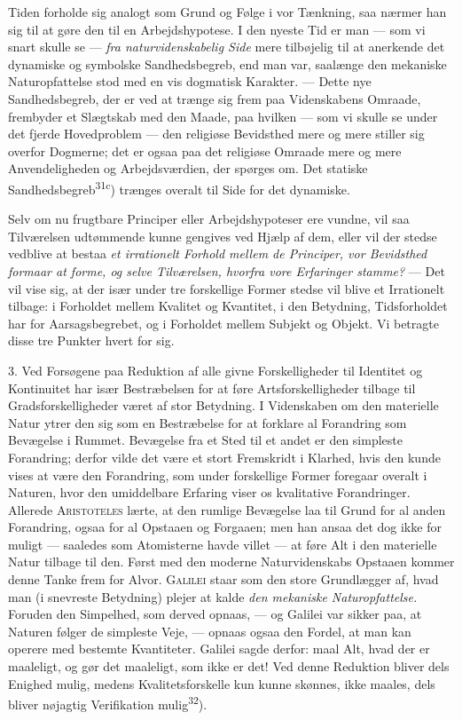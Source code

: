 \documentclass[12pt,a4paper,openany]{book}
\newcommand{\opage}[1]{\marginnote{\footnotesize\textit{[#1]}}}
\begin{document}
Tiden forholde sig analogt som Grund og Følge i vor Tænkning, saa nærmer han
sig til at gøre den til en Arbejdshypotese. I den nyeste Tid er man --- som vi
snart skulle se --- \textit{fra naturvidenskabelig Side} mere tilbøjelig til at
anerkende det dynamiske og symbolske Sandhedsbegreb, end man var, saalænge den
mekaniske Naturopfattelse stod med en vis dogmatisk Karakter. --- Dette nye
Sandhedsbegreb, der er ved at trænge sig frem paa Videnskabens Omraade,
frembyder et Slægtskab med den Maade, paa hvilken --- som vi skulle se under
det fjerde Hovedproblem --- den religiøse Bevidsthed mere og mere stiller sig
overfor Dogmerne; det er ogsaa paa det religiøse Omraade mere og mere
Anvendeligheden og Arbejdsværdien, der spørges om. Det statiske
Sandhedsbegreb\textsuperscript{31c}) trænges overalt til Side for det dynamiske.

Selv om nu frugtbare Principer eller Arbejdshypoteser ere vundne, vil saa
Tilværelsen udtømmende kunne gengives ved Hjælp af dem, eller vil der stedse
vedblive at bestaa \textit{et irrationelt Forhold mellem de Principer, vor
Bevidsthed formaar at forme, og selve Tilværelsen, hvorfra vore Erfaringer
stamme?} --- Det vil vise sig, at der især under tre forskellige Former stedse
vil blive et Irrationelt tilbage: i Forholdet mellem Kvalitet og Kvantitet, i
den Betydning, Tidsforholdet har for Aarsagsbegrebet, og i Forholdet mellem
Subjekt og Objekt. Vi betragte disse tre Punkter hvert for sig.

\opage{39}3. Ved Forsøgene paa Reduktion af alle givne Forskelligheder til
Identitet og Kontinuitet har især Bestræbelsen for at føre Artsforskelligheder
tilbage til Gradsforskelligheder været af stor Betydning. I Videnskaben om den
materielle Natur ytrer den sig som en Bestræbelse for at forklare al Forandring
som Bevægelse i Rummet. Bevægelse fra et Sted til et andet er den simpleste
Forandring; derfor vilde det være et stort Fremskridt i Klarhed, hvis den kunde
vises at være den Forandring, som under forskellige Former foregaar overalt i
Naturen, hvor den umiddelbare Erfaring viser os kvalitative Forandringer.
Allerede \textsc{Aristoteles} lærte, at den rumlige Bevægelse laa til Grund for
al anden Forandring, ogsaa for al Opstaaen og Forgaaen; men han ansaa det dog
ikke for muligt --- saaledes som Atomisterne havde villet --- at føre Alt i den
materielle Natur tilbage til den. Først med den moderne Naturvidenskabs
Opstaaen kommer denne Tanke frem for Alvor. \textsc{Galilei} staar som den
store Grundlægger af, hvad man (i snevreste Betydning) plejer at kalde
\textit{den mekaniske Naturopfattelse.} Foruden den Simpelhed, som derved
opnaas, --- og Galilei var sikker paa, at Naturen følger de simpleste Veje, ---
opnaas ogsaa den Fordel, at man kan operere med bestemte Kvantiteter. Galilei
sagde derfor: maal Alt, hvad der er maaleligt, og gør det maaleligt, som ikke
er det! Ved denne Reduktion bliver dels Enighed mulig, medens
Kvalitetsforskelle kun kunne skønnes, ikke maales, dels bliver nøjagtig
Verifikation mulig\textsuperscript{32}).
\end{document}
